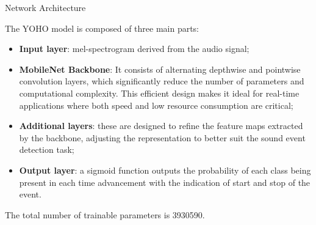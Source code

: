 	\begin{frame}{Network Architecture}

		The YOHO model is composed of three main parts:

		\begin{itemize}
			\item \textbf{Input layer}: mel-spectrogram derived from the audio signal;
			\item {\textbf{MobileNet Backbone}: It consists of alternating depthwise and pointwise convolution layers,
				which significantly reduce the number of parameters and computational complexity. This efficient design
				makes it ideal for real-time applications where both speed and low resource consumption are critical;}
			\item {\textbf{Additional layers}: these are designed to refine the feature maps extracted by the backbone,
				adjusting the representation to better suit the sound event detection task;}
			\item {\textbf{Output layer}: a sigmoid function outputs the probability of each class being present in
				each time advancement with the indication of start and stop of the event.}
		\end{itemize} 

		The total number of trainable parameters is \SI{3930590}{}.

	\end{frame}

